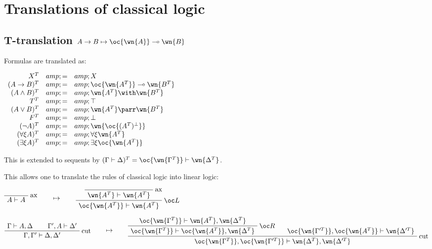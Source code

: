 \section{Translations of classical logic}\label{translations-of-classical-logic}

\subsection{\texorpdfstring{T-translation \(A\imp B \mapsto \oc{\wn{A}}\limp\wn{B}\)}{T-translation A\textbackslash{}imp B \textbackslash{}mapsto \textbackslash{}oc\{\textbackslash{}wn\{A\}\}\textbackslash{}limp\textbackslash{}wn\{B\}}}\label{t-translation-aimp-b-mapsto-ocwnalimpwnb}

Formulas are translated as:

\(\begin{array}{rcl}
X^T &amp; = &amp; X \\
(A\imp B)^T &amp; = &amp; \oc{\wn{A^T}}\limp\wn{B^T} \\
(A\wedge B)^T &amp; = &amp; \wn{A^T} \with \wn{B^T} \\
T^T &amp; = &amp; \top \\
(A\vee B)^T &amp; = &amp; \wn{A^T}\parr\wn{B^T} \\
F^T &amp; = &amp; \bot \\
(\neg A)^T &amp; = &amp; \wn{\oc{(A^T)\orth}} \\
(\forall\xi A)^T &amp; = &amp; \forall\xi \wn{A^T} \\
(\exists\xi A)^T &amp; = &amp; \exists\xi \oc{\wn{A^T}}
\end{array}\)

This is extended to sequents by
\((\Gamma\vdash\Delta)^T = \oc{\wn{\Gamma^T}}\vdash\wn{\Delta^T}\).

This allows one to translate the rules of classical logic into linear
logic:

\(\LabelRule{\rulename{ax}}
\NulRule{A\vdash A}
\DisplayProof
\qquad\mapsto\qquad
\LabelRule{\rulename{ax}}
\NulRule{\wn{A^T}\vdash\wn{A^T}}
\LabelRule{\oc L}
\UnaRule{\oc{\wn{A^T}}\vdash\wn{A^T}}
\DisplayProof\)

\(\AxRule{\Gamma\vdash A,\Delta}
\AxRule{\Gamma',A\vdash\Delta'}
\LabelRule{\rulename{cut}}
\BinRule{\Gamma,\Gamma'\vdash\Delta,\Delta'}
\DisplayProof
\qquad\mapsto\qquad
\AxRule{\oc{\wn{\Gamma^T}}\vdash\wn{A^T},\wn{\Delta^T}}
\LabelRule{\oc R}
\UnaRule{\oc{\wn{\Gamma^T}}\vdash\oc{\wn{A^T}},\wn{\Delta^T}}
\AxRule{\oc{\wn{\Gamma'^T}},\oc{\wn{A^T}}\vdash\wn{\Delta'^T}}
\LabelRule{\rulename{cut}}
\BinRule{\oc{\wn{\Gamma^T}},\oc{\wn{\Gamma'^T}}\vdash\wn{\Delta^T},\wn{\Delta'^T}}
\DisplayProof\)

